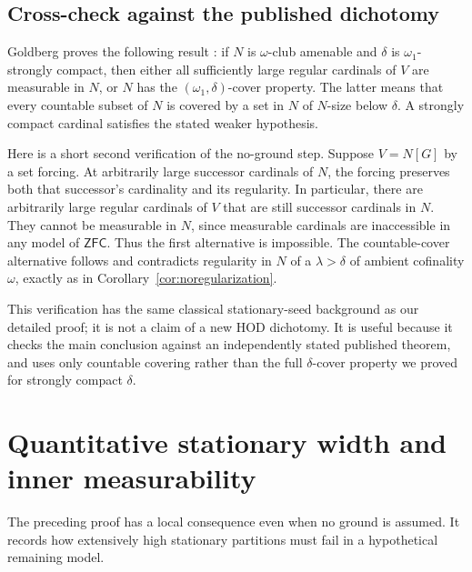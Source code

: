 \documentclass[11pt,letterpaper]{article}
\theoremstyle{definition}
\numberwithin{equation}{section}
\newcommand{\ZFC}{\mathsf{ZFC}}
\begin{document}
\subsection{Cross-check against the published dichotomy}\label{sec:crosscheck}

Goldberg proves the following result
\cite[Lemma~2.7]{dichotomy}: if $N$ is $\omega$-club amenable and
$\delta$ is $\omega_1$-strongly compact, then either all sufficiently
large regular cardinals of $V$ are measurable in $N$, or $N$ has the
$(\omega_1,\delta)$-cover property. The latter means that every
countable subset of $N$ is covered by a set in $N$ of $N$-size below
$\delta$. A strongly compact cardinal satisfies the stated weaker
hypothesis.

Here is a short second verification of the no-ground step. Suppose
$V=N[G]$ by a set forcing. At arbitrarily large successor cardinals of
$N$, the forcing preserves both that successor's cardinality and its
regularity. In particular, there are arbitrarily large regular
cardinals of $V$ that are still successor cardinals in $N$. They cannot
be measurable in $N$, since measurable cardinals are inaccessible in
any model of $\ZFC$. Thus the first alternative is impossible. The
countable-cover alternative follows and contradicts regularity in
$N$ of a $\lambda>\delta$ of ambient cofinality $\omega$, exactly as
in Corollary~\ref{cor:noregularization}.

This verification has the same classical stationary-seed background
as our detailed proof; it is not a claim of a new HOD dichotomy. It is
useful because it checks the main conclusion against an independently
stated published theorem, and uses only countable covering rather than
the full $\delta$-cover property we proved for strongly compact
$\delta$.

\section{Quantitative stationary width and inner measurability}\label{sec:width}

The preceding proof has a local consequence even when no ground is
assumed. It records how extensively high stationary partitions must
fail in a hypothetical remaining model.
\end{document}
